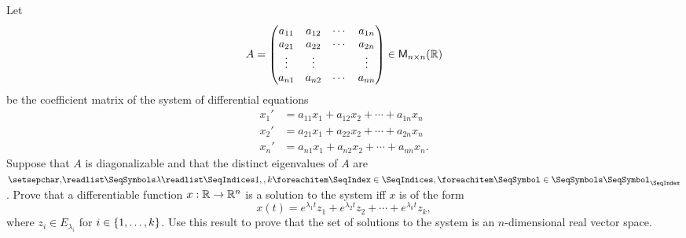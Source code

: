 \setcounter{ex}{14}
\begin{ex}\label{ex:5.2.15}
	Let
	\[
		A = \begin{pmatrix}
			a_{1 1} & a_{1 2} & \cdots & a_{1 n} \\
			a_{2 1} & a_{2 2} & \cdots & a_{2 n} \\
			\vdots  & \vdots  &        & \vdots  \\
			a_{n 1} & a_{n 2} & \cdots & a_{n n}
		\end{pmatrix} \in \mathsf{M}_{{n} \times n}({\mathbb{R}})
	\]
	be the coefficient matrix of the system of differential equations
	\begin{align*}
		x_1' & = a_{1 1} x_1 + a_{1 2} x_2 + \cdots + a_{1 n} x_n  \\
		x_2' & = a_{2 1} x_1 + a_{2 2} x_2 + \cdots + a_{2 n} x_n  \\
		x_n' & = a_{n 1} x_1 + a_{n 2} x_2 + \cdots + a_{n n} x_n.
	\end{align*}
	Suppose that \(A\) is diagonalizable and that the distinct eigenvalues of \(A\) are \(\seq{\lambda}{1,,k}\).
	Prove that a differentiable function \(x : \mathbb{R} \to \mathbb{R}^n\) is a solution to the system iff \(x\) is of the form
	\[
		x(t) = e^{\lambda_1 t} z_1 + e^{\lambda_2 t} z_2 + \cdots + e^{\lambda_k t} z_k,
	\]
	where \(z_i \in E_{\lambda_i}\) for \(i \in \left\lbrace1, \dots, k\right\rbrace\).
	Use this result to prove that the set of solutions to the system is an \(n\)-dimensional real vector space.
\end{ex}

